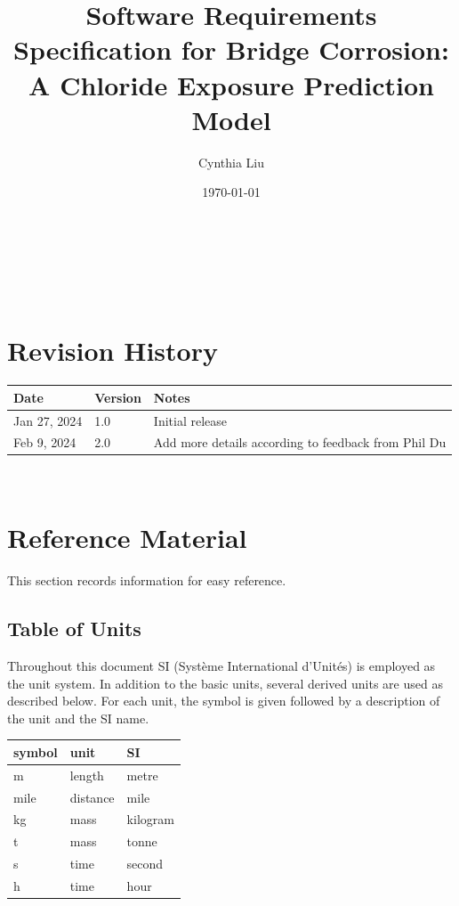 \documentclass[12pt]{article}
\begin{document}
\title{Software Requirements Specification for Bridge Corrosion: A Chloride Exposure Prediction Model} 
\author{Cynthia Liu}
\date{\today}
	
\maketitle

~\newpage


\tableofcontents

~\newpage

\section*{Revision History}

\begin{tabularx}{\textwidth}{p{3cm}p{2cm}X}
\toprule {\bf Date} & {\bf Version} & {\bf Notes}\\
\midrule
Jan 27, 2024 & 1.0 & Initial release\\
Feb 9, 2024 & 2.0 & Add more details according to feedback from Phil Du\\
\bottomrule
\end{tabularx}

~\newpage

\section{Reference Material}

This section records information for easy reference.

\subsection{Table of Units}

Throughout this document SI (Syst\`{e}me International d'Unit\'{e}s) is employed
as the unit system.  In addition to the basic units, several derived units are
used as described below.  For each unit, the symbol is given followed by a
description of the unit and the SI name.
~\newline

\renewcommand{\arraystretch}{1.2}
  \noindent \begin{tabular}{l l l} 
    \toprule		
    \textbf{symbol} & \textbf{unit} & \textbf{SI}\\
    \midrule 

    \si{\metre} & length & metre \\
    \si{mile} & distance & mile \\
    \si{\kilogram} & mass & kilogram \\
    \si{t} & mass & tonne \\
    \si{\second} & time & second \\
    \si{h} & time & hour \\

    \bottomrule
  \end{tabular}
\end{document}
